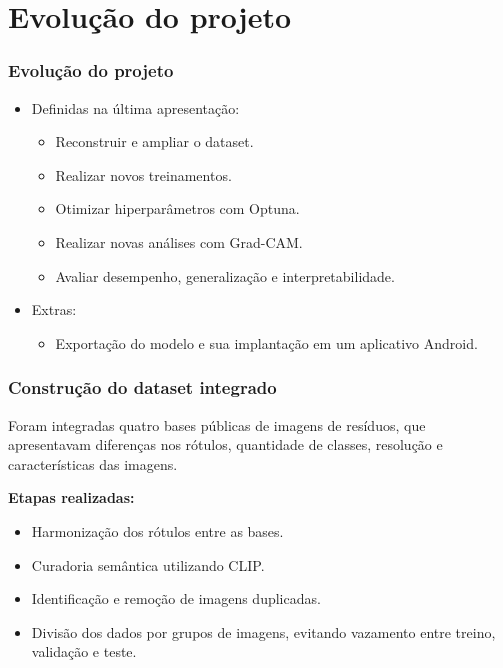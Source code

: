 \section{Evolução do projeto}


\begin{frame}

    \frametitle{Evolução do projeto}
    
    \begin{itemize}
    	
    	\item Definidas na última apresentação:
		\begin{itemize}
			\item Reconstruir e ampliar o dataset.	
			\item Realizar novos treinamentos.	
			\item Otimizar hiperparâmetros com Optuna.	
			\item Realizar novas análises com Grad-CAM.
			\item Avaliar desempenho, generalização e interpretabilidade.			
		\end{itemize}
		
		 \item Extras:
		\begin{itemize}
			\item Exportação do modelo e sua implantação em um aplicativo Android.
		\end{itemize}
	\end{itemize}
\end{frame}

\begin{frame}
	
	\frametitle{Construção do dataset integrado}
	
	Foram integradas quatro bases públicas de imagens de resíduos, que apresentavam diferenças nos rótulos, quantidade de classes, resolução e características das imagens.

	\textbf{Etapas realizadas:}
	\begin{itemize}
		\item Harmonização dos rótulos entre as bases.
		\item Curadoria semântica utilizando CLIP.
		\item Identificação e remoção de imagens duplicadas.
		\item Divisão dos dados por grupos de imagens, evitando vazamento entre treino, validação e teste.
	\end{itemize}
	
\end{frame}

